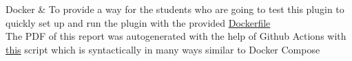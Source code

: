 \documentclass{report}
\begin{document}
\begin{table}[H]
\begin{tblr}
    Docker                 & {\hspace{\dimexpr\labelsep+0.5\tabcolsep} To provide a way for the students who are going to test this plugin to quickly set up and run the plugin with the provided \href{https://github.com/matthejue/RETI-Debugger/blob/main/Dockerfile}{Dockerfile}\\\hspace{\dimexpr\labelsep+0.5\tabcolsep} The PDF of this report was autogenerated with the help of Github Actions with \href{https://github.com/matthejue/RETI-Debugger_Documentation/blob/master/.github/workflows/create_and_upload_pdf.yml}{this} script which is syntactically in many ways similar to Docker Compose}                                                                                                                                       \\

\end{tblr}
\end{table}
\end{document}
